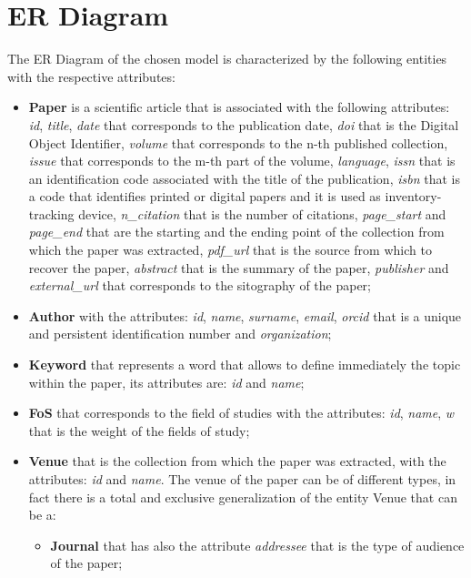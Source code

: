 \documentclass{Configuration_Files/PoliMi3i_thesis}
\begin{document}
\section{ER Diagram}
The ER Diagram of the chosen model is characterized by the following entities with the respective attributes:\\
\begin{itemize}
    \item \textbf{Paper} is a scientific article that is associated with the following attributes:\\
            \textit{id}, \textit{title}, \textit{date} that corresponds to the publication date, \textit{doi} that is the Digital Object Identifier, \textit{volume} that corresponds to the n-th published collection, \textit{issue} that corresponds to the m-th part of the volume, \textit{language}, \textit{issn} that is an identification code associated with the title of the publication, \textit{isbn} that is a code that identifies printed or digital papers and it is used as inventory-tracking device, \textit{n\_citation} that is the number of citations, \textit{page\_start} and \textit{page\_end} that are the starting and the ending point of the collection from which the paper was extracted, \textit{pdf\_url} that is the source from which to recover the paper, \textit{abstract} that is the summary of the paper, \textit{publisher} and \textit{external\_url} that corresponds to the sitography of the paper;
    \item \textbf{Author} with the attributes: \textit{id}, \textit{name}, \textit{surname}, \textit{email}, \textit{orcid} that is a unique and persistent identification number and \textit{organization};
    \item \textbf{Keyword} that represents a word that allows to define immediately the topic within the paper, its attributes are: \textit{id} and \textit{name};
    \item \textbf{FoS} that corresponds to the field of studies with the attributes: \textit{id}, \textit{name}, \textit{w} that is the weight of the fields of study;
    \item \textbf{Venue} that is the collection from which the paper was extracted, with the attributes: \textit{id} and \textit{name}. The venue of the paper can be of different types, in fact there is a total and exclusive generalization of the entity Venue that can be a:
        \begin{itemize}
            \item \textbf{Journal} that has also the attribute \textit{addressee} that is the type of audience of the paper;

\end{itemize}
\end{itemize}
\end{document}
